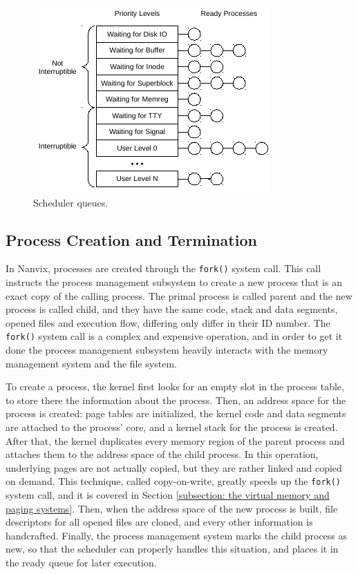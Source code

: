 	\begin{figure}[t]
		\centering
		\includegraphics[scale=1.4]{img/scheduler}
		\caption{Scheduler queues.}
		\label{figure: scheduler}
	\end{figure}

\subsection{Process Creation and Termination}

	In Nanvix, processes are created through the \texttt{fork()}
	system call. This call instructs the process management
	subsystem to create a new process that is an exact copy of the
	calling process. The primal process is called parent and the new
	process is called child, and they have the same code, stack and
	data segments, opened files and execution flow, differing only
	differ in their ID number. The \texttt{fork()} system call is a
	complex and expensive operation, and in order to get it done the
	process management subsystem heavily interacts with the memory
	management system and the file system.

	To create a process, the kernel first looks for an empty slot in
	the process table, to store there the information about the
	process. Then, an address space for the process is created: page
	tables are initialized, the kernel code and data segments are
	attached to the process' core, and a kernel stack for the
	process is created. After that, the kernel duplicates every
	memory region of the parent process and attaches them to the
	address space of the child process. In this operation,
	underlying pages are not actually copied, but they are rather
	linked and copied on demand. This technique, called
	copy-on-write, greatly speeds up the \texttt{fork()} system
	call, and it is covered in Section \ref{subsection: the virtual
	memory and paging systems}. Then, when the address space of the
	new process is built, file descriptors for all opened files are
	cloned, and every other information is handcrafted. Finally, the
	process management system marks the child process as new, so
	that the scheduler can properly handles this situation, and
	places it in the ready queue for later execution.

